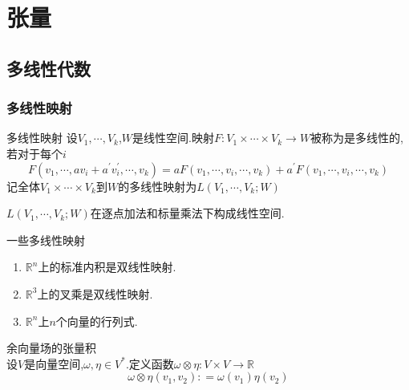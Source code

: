 \documentclass[../../几何与拓扑.tex]{subfiles}
\begin{document}
\ifSubfilesClassLoaded{
    \frontmatter

    \tableofcontents
    
    \mainmatter
}{}

    
\chapter{张量}


\section{多线性代数}
\subsection{多线性映射}

\begin{definition}{多线性映射}
    设$V_{1},{\cdots},V_{k}$,$W$是线性空间.映射$F:V_{1}\times{\cdots}\times V_{k}\to W$被称为是多线性的,若对于每个$i$ $$ F\left( v_{1},{\cdots},av_{i}+a^{\prime}v_{i}^{\prime} ,{\cdots},v_{k}\right) =aF\left( v_{1},{\cdots},v_{i},{\cdots},v_{k} \right) +a^{\prime}F\left( v_{1},{\cdots},v_{i},{\cdots},v_{k} \right)  $$记全体$V_{1}\times{\cdots}\times V_{k}$到$W$的多线性映射为$L\left( V_{1},{\cdots},V_{k};W \right)$
    
\end{definition}
\begin{remark}
    $L\left( V_{1},{\cdots},V_{k};W \right)$在逐点加法和标量乘法下构成线性空间.
\end{remark}

\begin{example}{一些多线性映射}
    \begin{enumerate}
        \item $\mathbb{R}^{n}$上的标准内积是双线性映射.
        \item $\mathbb{R}^{3}$上的叉乘是双线性映射.
        \item $\mathbb{R}^{n}$上$n$个向量的行列式.

    \end{enumerate}
    
\end{example}

\begin{example}{余向量场的张量积}
  \\设$V$是向量空间,$\omega,\eta \in V^{*}$.定义函数$\omega \otimes \eta:V\times V\to \mathbb{R}$ $$ \omega \otimes \eta \left( v_{1},v_{2} \right) : = \omega \left( v_{1} \right) \eta \left( v_{2} \right)  $$
\end{example}
\end{document}
